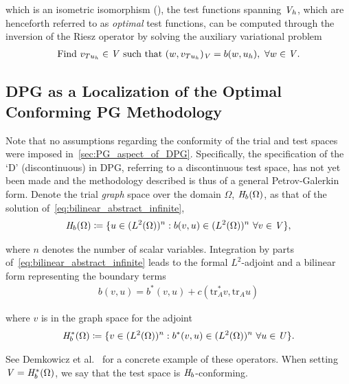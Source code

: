which is an isometric isomorphism (\cite[Theorem ]{Ciarlet2013}), the test functions
spanning $\mathit{{{V}}}_h$, which are henceforth referred to as \emph{optimal} test
functions, can be computed through the inversion of the Riesz operator by solving the auxiliary variational problem
\begin{align} \label{eq:auxiliary_opt_v}
\text{Find}\ v_{T u_h} \in \mathit{{{V}}}\ \text{such that}\
(w,v_{T u_h})_{\mathit{{{V}}}} = b(w,u_h),\ \forall w \in \mathit{{{V}}}.
\end{align}

\subsection{DPG as a Localization of the Optimal Conforming PG Methodology} \label{sec:dpg_abstract_setting}

Note that no assumptions regarding the conformity of the trial and test spaces were imposed
in~\autoref{sec:PG_aspect_of_DPG}. Specifically, the specification of the `D' (discontinuous) in DPG, referring to a
discontinuous test space, has not yet been made and the methodology described is thus of a general Petrov-Galerkin
form. Denote the trial \emph{graph} space over the domain $\Omega$, $\mathit{{{H}}}_b(\Omega)$, as that of the solution
of~\eqref{eq:bilinear_abstract_infinite},
\begin{align}
\mathit{{{H}}}_b(\Omega) \coloneqq
\{ u \in (L^2(\Omega))^n : b(v,u) \in (L^2(\Omega))^n\ \forall v \in \mathit{{{V}}} \},
\end{align}

where $n$ denotes the number of scalar variables. Integration by parts of~\eqref{eq:bilinear_abstract_infinite} leads to
the formal $L^2$-adjoint and a bilinear form representing the boundary terms
\begin{align}
b(v,u) = b^*(v,u) + c(\text{tr}_A^* v, \text{tr}_A u)
\end{align}

where $v$ is in the graph space for the adjoint
\begin{align}
\mathit{{{H}}}_b^*(\Omega) \coloneqq
\{ v \in (L^2(\Omega))^n : b^*(v,u) \in (L^2(\Omega))^n\ \forall u \in \mathit{{{U}}} \}.
\end{align}

See Demkowicz et al.~\cite[eq. ()]{Demkowicz2014_overview} for a concrete example of these operators.
When setting $\mathit{{{V}}} = \mathit{{{H}}}_b^*(\Omega)$, we say that the test space is $\mathit{{{H}}}_b$-conforming.
\\~

